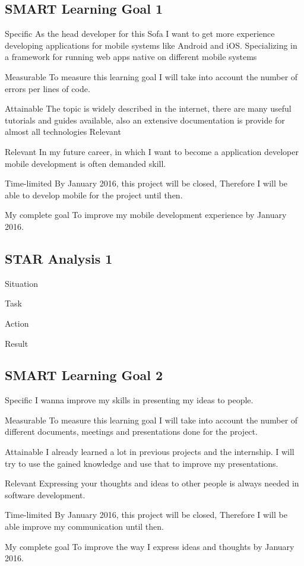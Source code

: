 \documentclass[12pt]{article}
\begin{document}
\subsection{SMART Learning Goal 1}
\begin{SMART}
    \item[Specific] As the head developer for this Sofa I want to get more experience developing applications for mobile systems like Android and iOS. Specializing in a framework for running web apps native on different mobile systems
    \item[Measurable] To measure this learning goal I will take into account the number of errors per lines of code.
    \item[Attainable] The topic is widely described in the internet, there are many useful tutorials and guides available, also an extensive documentation is provide for almost all technologies
Relevant
    \item[Relevant] In my future career, in which I want to become a application developer mobile development is often demanded skill.
    \item[Time-limited] By January 2016, this project will be closed, Therefore I will be able to develop mobile for the project until then.
    \item[My complete goal] To improve my mobile development experience by January 2016.
\end{SMART}

\subsection{STAR Analysis 1}
\begin{STAR}
    \item[Situation]
    \item[Task]
    \item[Action]
    \item[Result]
\end{STAR}

\subsection{SMART Learning Goal 2}
\begin{SMART}
    \item[Specific] I wanna improve my skills in presenting my ideas to people.
    \item[Measurable] To measure this learning goal I will take into account the number of different documents, meetings and presentations done for the project.
    \item[Attainable] I already learned a lot in previous projects and the internship. I will try to use the gained knowledge and use that to improve my presentations.
    \item[Relevant] Expressing your thoughts and ideas to other people is always needed in software development.
    \item[Time-limited] By January 2016, this project will be closed, Therefore I will be able improve my communication until then.
    \item[My complete goal] To improve the way I express ideas and thoughts by January 2016.
\end{SMART}
\end{document}
